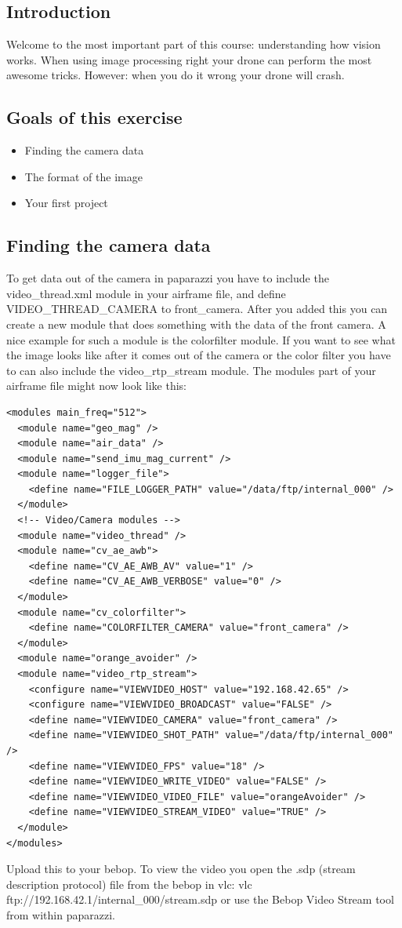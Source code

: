 \documentclass{article}
\begin{document}

\subsection*{Introduction}
Welcome to the most important part of this course: understanding how vision works. When using image processing right your drone can perform the most awesome tricks. However: when you do it wrong your drone will crash. 

\subsection*{Goals of this exercise}
\begin{itemize}
\item Finding the camera data
\item The format of the image
\item Your first project
\end{itemize}

\subsection*{Finding the camera data}
To get data out of the camera in paparazzi you have to include the video\_thread.xml module in your airframe file, and define VIDEO\_THREAD\_CAMERA to front\_camera. After you added this you can create a new module that does something with the data of the front camera. A nice example for such a module is the colorfilter module.
If you want to see what the image looks like after it comes out of the camera or the color filter you have to can also include the video\_rtp\_stream  module. 
The modules part of your airframe file might now look like this:
\begin{verbatim}
<modules main_freq="512">
  <module name="geo_mag" />
  <module name="air_data" />
  <module name="send_imu_mag_current" />
  <module name="logger_file">
    <define name="FILE_LOGGER_PATH" value="/data/ftp/internal_000" />
  </module>
  <!-- Video/Camera modules -->
  <module name="video_thread" />
  <module name="cv_ae_awb">
    <define name="CV_AE_AWB_AV" value="1" />
    <define name="CV_AE_AWB_VERBOSE" value="0" />
  </module>
  <module name="cv_colorfilter">
    <define name="COLORFILTER_CAMERA" value="front_camera" />
  </module>
  <module name="orange_avoider" />
  <module name="video_rtp_stream">
    <configure name="VIEWVIDEO_HOST" value="192.168.42.65" />
    <configure name="VIEWVIDEO_BROADCAST" value="FALSE" />
    <define name="VIEWVIDEO_CAMERA" value="front_camera" />
    <define name="VIEWVIDEO_SHOT_PATH" value="/data/ftp/internal_000" />
    <define name="VIEWVIDEO_FPS" value="18" />
    <define name="VIEWVIDEO_WRITE_VIDEO" value="FALSE" />
    <define name="VIEWVIDEO_VIDEO_FILE" value="orangeAvoider" />
    <define name="VIEWVIDEO_STREAM_VIDEO" value="TRUE" />
  </module>
</modules>
\end{verbatim}
Upload this to your bebop. To view the video you open the .sdp (stream description protocol) file from the bebop in vlc: vlc ftp://192.168.42.1/internal\_000/stream.sdp or use the Bebop Video Stream tool from within paparazzi.
 
\end{document}
